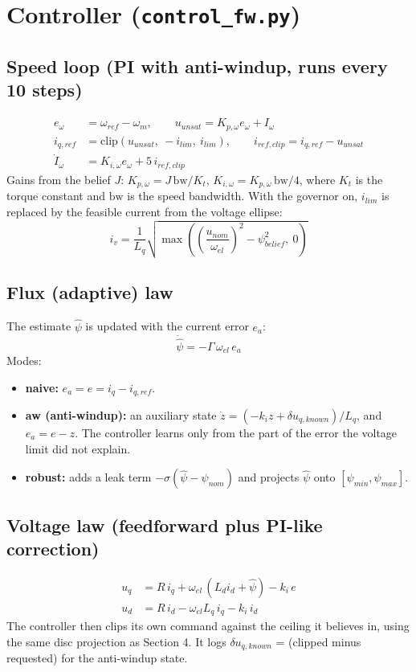 \documentclass[11pt]{article}
\begin{document}
\section{Controller (\texttt{control\_fw.py})}
\subsection*{Speed loop (PI with anti-windup, runs every 10 steps)}
\begin{align}
e_\omega &= \omega_{ref} - \omega_m, \qquad u_{unsat} = K_{p,\omega} e_\omega + I_\omega\\
i_{q,ref} &= \mathrm{clip}(u_{unsat},\ -i_{lim},\ i_{lim}), \qquad i_{ref,clip} = i_{q,ref} - u_{unsat}\\
\dot I_\omega &= K_{i,\omega} e_\omega + 5\, i_{ref,clip}
\end{align}
Gains from the belief $J$: $K_{p,\omega} = J\,\mathrm{bw}/K_t$, $K_{i,\omega} = K_{p,\omega}\,\mathrm{bw}/4$, where $K_t$ is the torque constant and $\mathrm{bw}$ is the speed bandwidth.
With the governor on, $i_{lim}$ is replaced by the feasible current from the voltage ellipse:
\begin{equation}
i_{v} = \frac{1}{L_q}\sqrt{\max\!\left(\left(\frac{u_{nom}}{\omega_{el}}\right)^2 - \psi_{belief}^2,\ 0\right)}
\end{equation}

\subsection*{Flux (adaptive) law}
The estimate $\hat\psi$ is updated with the current error $e_a$:
\begin{equation}
\dot{\hat\psi} = -\Gamma\,\omega_{el}\, e_a
\end{equation}
Modes:
\begin{itemize}
\item \textbf{naive:} $e_a = e = i_q - i_{q,ref}$.
\item \textbf{aw (anti-windup):} an auxiliary state $\dot z = (-k_i z + \delta u_{q,known})/L_q$, and $e_a = e - z$. The controller learns only from the part of the error the voltage limit did not explain.
\item \textbf{robust:} adds a leak term $-\sigma(\hat\psi - \psi_{nom})$ and projects $\hat\psi$ onto $[\psi_{min}, \psi_{max}]$.
\end{itemize}

\subsection*{Voltage law (feedforward plus PI-like correction)}
\begin{align}
u_q &= R\, i_q + \omega_{el}\,(L_d i_d + \hat\psi) - k_i\, e\\
u_d &= R\, i_d - \omega_{el} L_q\, i_q - k_i\, i_d
\end{align}
The controller then clips its own command against the ceiling it believes in, using the same disc projection as Section 4. It logs $\delta u_{q,known}$ = (clipped minus requested) for the anti-windup state.
\end{document}
